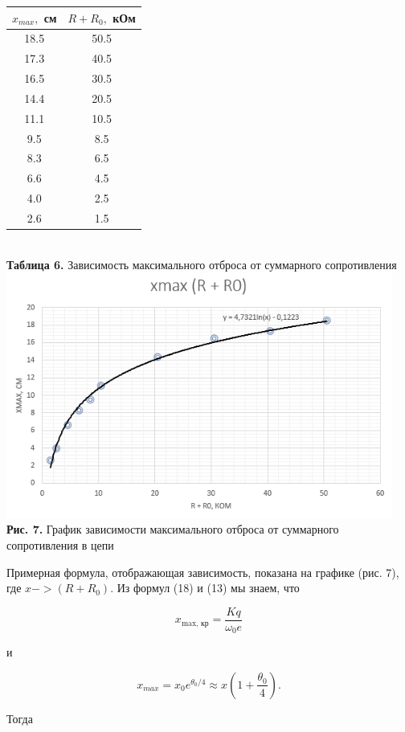 \documentclass[a4paper,12pt]{article} %
\begin{document}
\begin{center}
\begin{tabular}{|c|c|}\hline
$ x_{max}, $ см & $ R + R_{0}, $ кОм\\\hline
18.5 & 50.5 \\\hline
17.3 & 40.5 \\\hline
16.5 & 30.5 \\\hline
14.4 & 20.5 \\\hline
11.1 & 10.5 \\\hline
9.5 & 8.5 \\\hline
8.3 & 6.5 \\\hline
6.6 & 4.5 \\\hline
4.0 & 2.5 \\\hline
2.6 & 1.5 \\\hline
\end{tabular} \\
\hfill \break \textbf {Таблица 6.} Зависимость максимального отброса от суммарного сопротивления\\
\includegraphics[width=0.95\textwidth]{3.2.6_7.png}\\
\textbf{Рис. 7.} График зависимости максимального отброса от суммарного сопротивления в цепи\\
\end{center}

\hfill \break Примерная формула, отображающая зависимость, показана на графике (рис. 7), где $x -> (R+R_{0})$. Из формул (18) и (13) мы знаем, что

$$
x_\text{max, кр} = \frac{Kq}{\omega_{0}e}
$$

\hfill \break и

$$
x_{max} = x_{0}e^{\theta_{0}/4} \approx x(1 + \frac{\theta_{0}}{4}).
$$

\hfill \break Тогда 
\end{document}
